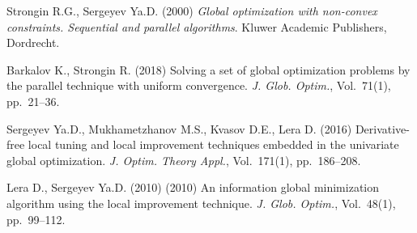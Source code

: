 \documentclass[oribibl]{llncs}
\begin{document}
\begin{thebibliography}{4}

 Strongin R.G., Sergeyev Ya.D. (2000) \emph{Global optimization with non-convex constraints. Sequential and parallel algorithms}. Kluwer Academic Publishers, Dordrecht.

 Barkalov K., Strongin R. (2018) Solving a set of global optimization problems by the parallel technique with uniform convergence. \emph{J. Glob. Optim.}, Vol.~71(1), pp.~21--36.

 Sergeyev Ya.D., Mukhametzhanov M.S., Kvasov D.E., Lera D. (2016) Derivative-free local tuning and local improvement techniques embedded in the univariate global optimization. \emph{J. Optim. Theory Appl.}, Vol.~171(1), pp.~186--208.

 Lera D., Sergeyev Ya.D. (2010)  (2010) An information global minimization algorithm using the local improvement technique. \emph{J. Glob. Optim.}, Vol.~48(1), pp.~99--112.

\end{thebibliography}
\end{document}
